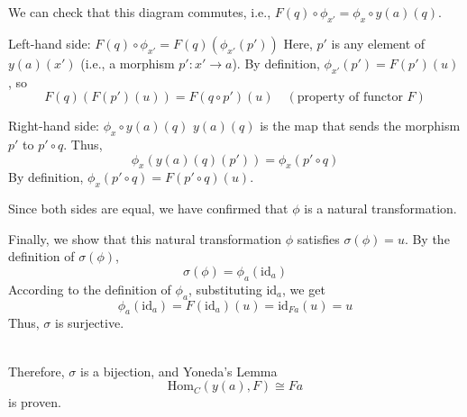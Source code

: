 \documentclass[uplatex,a4j,12pt,dvipdfmx]{jsarticle}
\begin{document}
We can check that this diagram commutes, i.e., $F(q) \circ \phi_{x'} = \phi_x \circ y(a)(q)$.

Left-hand side: $F(q) \circ \phi_{x'} = F(q)(\phi_{x'}(p'))$
Here, $p'$ is any element of $y(a)(x')$ (i.e., a morphism $p': x' \to a$).
By definition, $\phi_{x'}(p') = F(p')(u)$, so
$$ F(q)(F(p')(u)) = F(q \circ p')(u) \quad (\text{property of functor } F) $$

Right-hand side: $\phi_x \circ y(a)(q)$
$y(a)(q)$ is the map that sends the morphism $p'$ to $p' \circ q$.
Thus,
$$ \phi_x(y(a)(q)(p')) = \phi_x(p' \circ q) $$
By definition, $\phi_x(p' \circ q) = F(p' \circ q)(u)$.

Since both sides are equal, we have confirmed that $\phi$ is a natural transformation.

Finally, we show that this natural transformation $\phi$ satisfies $\sigma(\phi) = u$.
By the definition of $\sigma(\phi)$,
$$ \sigma(\phi) = \phi_a(\text{id}_a) $$
According to the definition of $\phi_a$, substituting $\text{id}_a$, we get
$$ \phi_a(\text{id}_a) = F(\text{id}_a)(u) = \text{id}_{Fa}(u) = u $$
Thus, $\sigma$ is surjective.

\ \\

Therefore, $\sigma$ is a bijection, and
Yoneda's Lemma
\[
	\text{Hom}_{C}(y(a),F) \cong Fa
\]
is proven.
\end{document}
